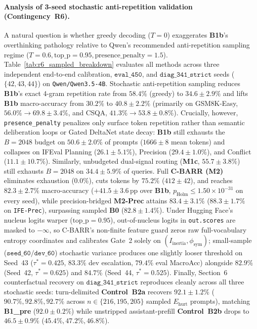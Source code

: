 \documentclass{article}
\begin{document}
\paragraph{Analysis of 3-seed stochastic anti-repetition validation (Contingency~R6).}
A natural question is whether greedy decoding ($T=0$) exaggerates \textbf{B1b}'s overthinking pathology relative to Qwen's recommended anti-repetition sampling regime ($T=0.6, \text{top\_p}=0.95, \text{presence\_penalty}=1.5$). Table~\ref{tab:r6_sampled_breakdown} evaluates all methods across three independent end-to-end calibration, $\texttt{eval\_450}$, and $\texttt{diag\_341\_strict}$ seeds ($\{42, 43, 44\}$) on \texttt{Qwen/Qwen3.5-4B}. Stochastic anti-repetition sampling reduces \textbf{B1b}'s exact 4-gram repetition rate from $58.4\%$ (greedy) to $34.6 \pm 2.9\%$ and lifts \textbf{B1b} macro-accuracy from $30.2\%$ to $40.8 \pm 2.2\%$ (primarily on GSM8K-Easy, $56.0\% \to 69.8 \pm 3.4\%$, and CSQA, $41.3\% \to 53.8 \pm 0.8\%$). Crucially, however, \texttt{presence\_penalty} penalizes only surface token repetition rather than semantic deliberation loops or Gated DeltaNet state decay: \textbf{B1b} still exhausts the $B=2048$ budget on $50.6 \pm 2.0\%$ of prompts ($1666 \pm 8$ mean tokens) and collapses on IFEval Planning ($26.1 \pm 5.1\%$), Precision ($29.4 \pm 1.0\%$), and Conflict ($11.1 \pm 10.7\%$). Similarly, unbudgeted dual-signal routing (\textbf{M1c}, $55.7 \pm 3.8\%$) still exhausts $B=2048$ on $34.4 \pm 5.9\%$ of queries. Full \textbf{C-BARR (M2)} eliminates exhaustion ($0.0\%$), cuts tokens by $75.2\%$ ($412 \pm 42$), and reaches $82.3 \pm 2.7\%$ macro-accuracy ($+41.5 \pm 3.6$\,pp over \textbf{B1b}, $p_{\text{Holm}} \le 1.50 \times 10^{-31}$ on every seed), while precision-bridged \textbf{M2-Prec} attains $83.4 \pm 3.1\%$ ($88.3 \pm 1.7\%$ on \texttt{IFE-Prec}), surpassing sampled \textbf{B0} ($82.8 \pm 1.4\%$). Under Hugging Face's nucleus logits warper ($\text{top\_p}=0.95$), out-of-nucleus logits in \texttt{out.scores} are masked to $-\infty$, so C-BARR's non-finite feature guard zeros raw full-vocabulary entropy coordinates and calibrates Gate~2 solely on $(I_{\text{inertia}}, \phi_{\text{sym}})$; small-sample ($\texttt{seed\_60}/\texttt{dev\_60}$) stochastic variance produces one slightly looser threshold on Seed~43 ($\tau^*=0.425$, $83.3\%$ dev escalation, $79.4\%$ eval MacroAcc) alongside $82.9\%$ (Seed~42, $\tau^*=0.625$) and $84.7\%$ (Seed~44, $\tau^*=0.525$). Finally, Section~6 counterfactual recovery on $\texttt{diag\_341\_strict}$ reproduces cleanly across all three stochastic seeds: turn-delimited \textbf{Control~B2a} recovers $92.1 \pm 1.2\%$ ($90.7\%, 92.8\%, 92.7\%$ across $n \in \{216, 195, 205\}$ sampled $E_{\text{hurt}}$ prompts), matching \textbf{B1\_pre} ($92.0 \pm 0.2\%$) while unstripped assistant-prefill \textbf{Control~B2b} drops to $46.5 \pm 0.9\%$ ($45.4\%, 47.2\%, 46.8\%$).
\end{document}
